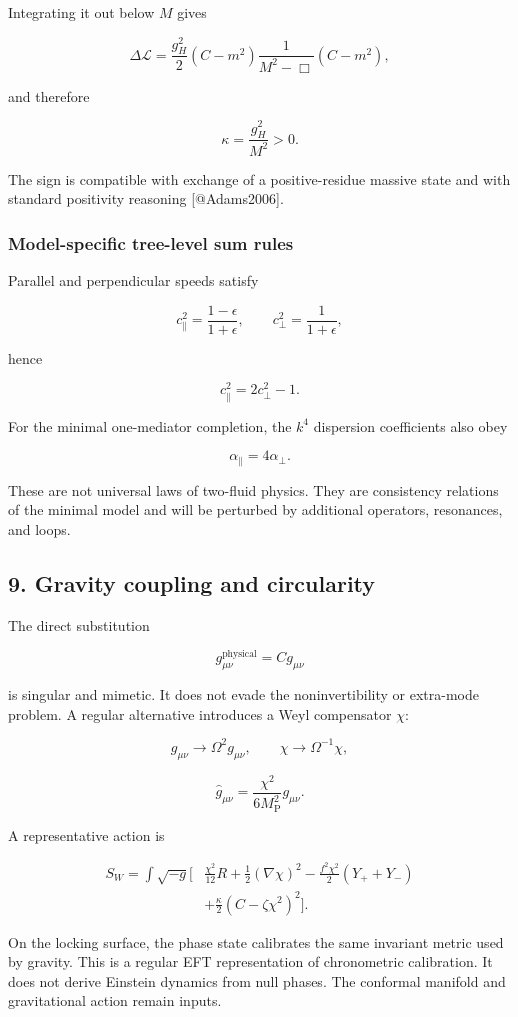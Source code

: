 \documentclass[
]{article}
\begin{document}
Integrating it out below \(M\) gives

\[
\Delta\mathcal L
=\frac{g_H^2}{2}(C-m^2)\frac1{M^2-\Box}(C-m^2),
\]

and therefore

\[
\boxed{\kappa=\frac{g_H^2}{M^2}>0.}
\]

The sign is compatible with exchange of a positive-residue massive state
and with standard positivity reasoning {[}@Adams2006{]}.

\hypertarget{model-specific-tree-level-sum-rules}{%
\subsubsection{Model-specific tree-level sum
rules}\label{model-specific-tree-level-sum-rules}}

Parallel and perpendicular speeds satisfy

\[
c_\parallel^2=\frac{1-\epsilon}{1+\epsilon},
\qquad
c_\perp^2=\frac1{1+\epsilon},
\]

hence

\[
\boxed{c_\parallel^2=2c_\perp^2-1.}
\]

For the minimal one-mediator completion, the \(k^4\) dispersion
coefficients also obey

\[
\boxed{\alpha_\parallel=4\alpha_\perp.}
\]

These are not universal laws of two-fluid physics. They are consistency
relations of the minimal model and will be perturbed by additional
operators, resonances, and loops.

\hypertarget{gravity-coupling-and-circularity}{%
\subsection{9. Gravity coupling and
circularity}\label{gravity-coupling-and-circularity}}

The direct substitution

\[
g^{\mathrm{physical}}_{\mu\nu}=Cg_{\mu\nu}
\]

is singular and mimetic. It does not evade the noninvertibility or
extra-mode problem. A regular alternative introduces a Weyl compensator
\(\chi\):

\[
g_{\mu\nu}\rightarrow\Omega^2g_{\mu\nu},
\qquad
\chi\rightarrow\Omega^{-1}\chi,
\]

\[
\widehat g_{\mu\nu}
=\frac{\chi^2}{6M_{\mathrm{P}}^2}g_{\mu\nu}.
\]

A representative action is

\[
\begin{aligned}
S_W=\int\sqrt{-g}\Big[&
\frac{\chi^2}{12}R
+\frac12(\nabla\chi)^2
-\frac{f^2\chi^2}{2}(Y_++Y_-)\\
&+\frac\kappa2(C-\zeta\chi^2)^2
\Big].
\end{aligned}
\]

On the locking surface, the phase state calibrates the same invariant
metric used by gravity. This is a regular EFT representation of
chronometric calibration. It does not derive Einstein dynamics from null
phases. The conformal manifold and gravitational action remain inputs.
\end{document}
